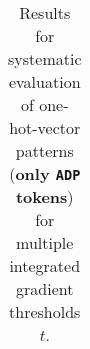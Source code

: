 \begin{table}[t]
\begin{tabular}{lllllll}

\hline
\end{tabular}
\caption[Model Evaluation for only \texttt{ADP} tokens]{Results for systematic evaluation of one-hot-vector patterns (\textbf{only \texttt{ADP} tokens}) for multiple integrated gradient thresholds $t$.}
\label{tab:evalResultsADP}
\end{table}
	